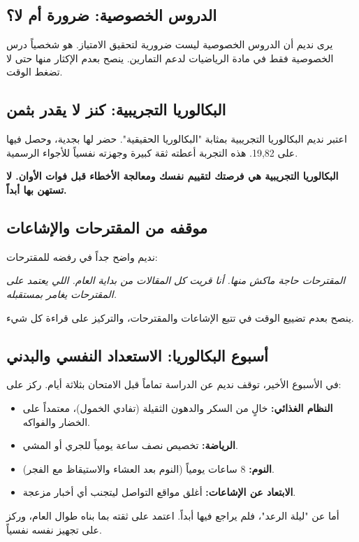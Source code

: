 \documentclass[12pt,a4paper]{book}
\newcommand{\quoteAr}[1]{%
	\begin{myquote}
		\itshape #1
	\end{myquote}
}
\newcommand{\importantAr}[1]{%
	\begin{important}
		\bfseries #1
	\end{important}
}
\begin{document}
	\subsection{الدروس الخصوصية: ضرورة أم لا؟}
	يرى نديم أن الدروس الخصوصية ليست ضرورية لتحقيق الامتياز. هو شخصياً درس الخصوصية فقط في مادة الرياضيات لدعم التمارين. ينصح بعدم الإكثار منها حتى لا تضغط الوقت.
	
	\subsection{البكالوريا التجريبية: كنز لا يقدر بثمن}
	اعتبر نديم البكالوريا التجريبية بمثابة "البكالوريا الحقيقية". حضر لها بجدية، وحصل فيها على 19,82. هذه التجربة أعطته ثقة كبيرة وجهزته نفسياً للأجواء الرسمية.
	\importantAr{البكالوريا التجريبية هي فرصتك لتقييم نفسك ومعالجة الأخطاء قبل فوات الأوان. لا تستهن بها أبداً.}
	
	\subsection{موقفه من المقترحات والإشاعات}
			\label{sec:philo-proposals-post3}
	نديم واضح جداً في رفضه للمقترحات: 
	\quoteAr{المقترحات حاجة ماكش منها. أنا قريت كل المقالات من بداية العام. اللي يعتمد على المقترحات يغامر بمستقبله.}
 	ينصح بعدم تضييع الوقت في تتبع الإشاعات والمقترحات، والتركيز على قراءة كل شيء.
	 

	\subsection{أسبوع البكالوريا: الاستعداد النفسي والبدني}
	في الأسبوع الأخير، توقف نديم عن الدراسة تماماً قبل الامتحان بثلاثة أيام. ركز على:
	\begin{itemize}
		\item \textbf{النظام الغذائي:} خالٍ من السكر والدهون الثقيلة (تفادي الخمول)، معتمداً على الخضار والفواكه.
		\item \textbf{الرياضة:} تخصيص نصف ساعة يومياً للجري أو المشي.
		\item \textbf{النوم:} 8 ساعات يومياً (النوم بعد العشاء والاستيقاظ مع الفجر).
		\item \textbf{الابتعاد عن الإشاعات:} أغلق مواقع التواصل ليتجنب أي أخبار مزعجة.
	\end{itemize}
	أما عن "ليلة الرعد"، فلم يراجع فيها أبداً. اعتمد على ثقته بما بناه طوال العام، وركز على تجهيز نفسه نفسياً.
	
\end{document}
